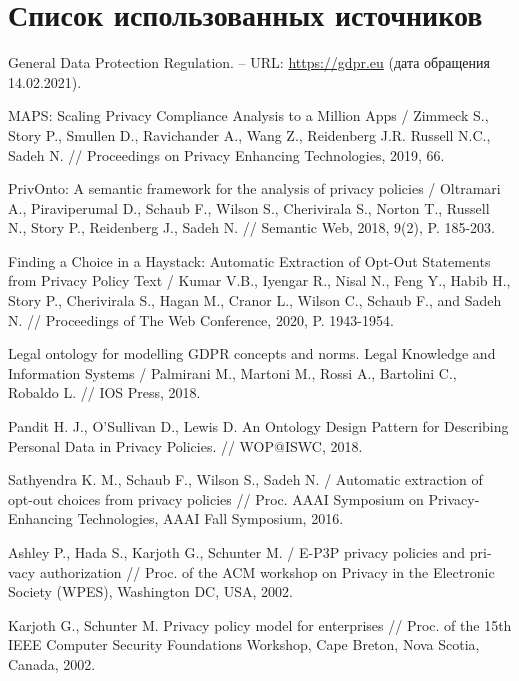 \documentclass[../main]{subfiles}
\begin{document}
\newpage
{}
\section*{Список использованных источников}

\begin{english}
\begin{biblenum}

     General Data Protection Regulation. -- URL: \url{https://gdpr.eu} (\textrussian{дата обращения} 14.02.2021).
    
     MAPS: Scaling Privacy Compliance Analysis to a Million Apps / Zimmeck S., Story P., Smullen D., Ravichander A., Wang Z., Reidenberg J.R. Russell N.C., Sadeh N. // Proceedings on Privacy Enhancing Technologies, 2019, 66.

     PrivOnto: A semantic framework for the analysis of privacy policies / Oltramari A., Piraviperumal D., Schaub F., Wilson S., Cherivirala S., Norton T., Russell N., Story P., Reidenberg J., Sadeh N. // Semantic Web, 2018, 9(2), P. 185-203.

     Finding a Choice in a Haystack: Automatic Extraction of Opt-Out Statements from Privacy Policy Text / Kumar V.B., Iyengar R., Nisal N., Feng Y., Habib H., Story P., Cherivirala S., Hagan M., Cranor L., Wilson C., Schaub F., and Sadeh N. // Proceedings of The Web Conference, 2020, P. 1943-1954.

     Legal ontology for modelling GDPR concepts and norms. Legal Knowledge and Information Systems / Palmirani M., Martoni M., Rossi A., Bartolini C., Robaldo L. // IOS Press, 2018.

     Pandit H. J., O’Sullivan D., Lewis D. An Ontology Design Pattern for Describing Personal Data in Privacy Policies. // WOP@ISWC, 2018.

     Sathyendra K. M., Schaub F., Wilson S., Sadeh N. / Automatic extraction of opt-out choices from privacy policies // Proc. AAAI Symposium on Privacy-Enhancing Technologies, AAAI Fall Symposium, 2016.

     Ashley P., Hada S., Karjoth G., Schunter M. / E-P3P privacy policies and privacy authorization // Proc. of the ACM workshop on Privacy in the Electronic Society (WPES), Washington DC, USA, 2002. 

     Karjoth G., Schunter M. Privacy policy model for enterprises // Proc. of the 15th IEEE Computer Security Foundations Workshop, Cape Breton, Nova Scotia, Canada, 2002. 
    

\end{biblenum}
\end{english}
\end{document}
